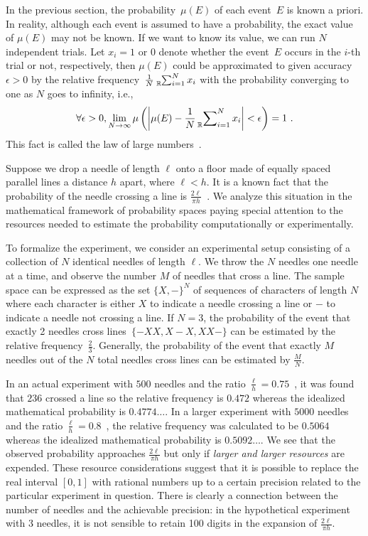 \documentclass{article}
\theoremstyle{remark}
\newcommand{\pmeas}{\ensuremath{\mu}}
\begin{document}
In the previous section, the probability~$\pmeas(E)$ of each event~$E$
is known a priori. In reality, although each event is assumed to have
a probability, the exact value of $\pmeas(E)$ may not be known. If
we want to know its value, we can run $N$ independent trials. Let
$x_{i}=1$ or $0$ denote whether the event~$E$ occurs in the $i$-th
trial or not, respectively, then $\pmeas(E)$ could be approximated
to given accuracy~$\epsilon>0$ by the relative frequency~$\frac{1}{N}\tensor*[_{\mathbb{R}}]{\sum}{_{i=1}^{N}}x_{i}$
with the probability converging to one as $N$ goes to infinity, i.e.,
\[
\forall\epsilon>0,\lim_{N\rightarrow\infty}\pmeas\left(\left|\pmeas(E)-\frac{1}{N}\sideset{_{\mathbb{R}}}{_{i=1}^{N}}\sum x_{i}\right|<\epsilon\right)=1\textrm{ .}
\]
This fact is called the law of large numbers~\cite{Bernoulli2006,Kolmogorov1950,Uspensky1937,Shafer1976,544199}.

Suppose we drop a needle of length $\ell$ onto a floor made of equally
spaced parallel lines a distance $h$ apart, where $\ell<h$. It is
a known fact that the probability of the needle crossing a line is
$\frac{2\ell}{\pi h}$~\cite{Buffon1777,DeMorgan1872,Hall1873,Uspensky1937}.
We analyze this situation in the mathematical framework of probability
spaces paying special attention to the resources needed to estimate
the probability computationally or experimentally.

To formalize the experiment, we consider an experimental setup consisting
of a collection of $N$ identical needles of length $\ell$. We throw
the $N$ needles one needle at a time, and observe the number $M$
of needles that cross a line. The sample space can be expressed as
the set $\{X,-\}^{N}$ of sequences of characters of length $N$ where
each character is either $X$ to indicate a needle crossing a line
or $-$ to indicate a needle not crossing a line. If $N=3$, the probability
of the event that exactly 2 needles cross lines~$\{-XX,X{-}X,XX-\}$
can be estimated by the relative frequency~$\frac{2}{3}$. Generally,
the probability of the event that exactly $M$ needles out of the
$N$ total needles cross lines can be estimated by $\frac{M}{N}$.

In an actual experiment with $500$ needles and the ratio
$\frac{\ell}{h}=0.75$~\cite{Hall1873}, it was found that $236$ crossed
a line so the relative frequency is $0.472$ whereas the idealized
mathematical probability is $0.4774\ldots$. In a larger experiment
with $5000$ needles and the ratio
$\frac{\ell}{h}=0.8$~\cite{Uspensky1937}, the relative frequency was
calculated to be $0.5064$ whereas the idealized mathematical
probability is $0.5092\ldots$. We see that the observed probability
approaches $\frac{2\ell}{\pi h}$ but only if \emph{larger and larger
  resources} are expended. These resource considerations suggest that
it is possible to replace the real interval $[0,1]$ with rational
numbers up to a certain precision related to the particular experiment
in question.  There is clearly a connection between the number of
needles and the achievable precision: in the hypothetical experiment
with 3 needles, it is not sensible to retain 100 digits in the
expansion of $\frac{2\ell}{\pi h}$.
\end{document}
